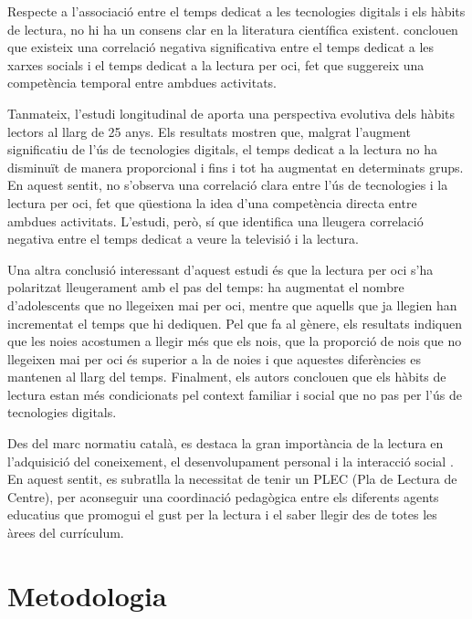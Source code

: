 \documentclass[12pt]{article}
\begin{document}
Respecte a l’associació entre el temps dedicat a les tecnologies digitals i els hàbits de lectura, no hi ha un consens clar en la literatura científica existent. \textcite{akande_library} conclouen que existeix una correlació negativa significativa entre el temps dedicat a les xarxes socials i el temps dedicat a la lectura per oci, fet que suggereix una competència temporal entre ambdues activitats.

Tanmateix, l’estudi longitudinal de \textcite{johnsson_bookreading} aporta una perspectiva evolutiva dels hàbits lectors al llarg de 25 anys. Els resultats mostren que, malgrat l’augment significatiu de l’ús de tecnologies digitals, el temps dedicat a la lectura no ha disminuït de manera proporcional i fins i tot ha augmentat en determinats grups. En aquest sentit, no s’observa una correlació clara entre l’ús de tecnologies i la lectura per oci, fet que qüestiona la idea d’una competència directa entre ambdues activitats. L’estudi, però, sí que identifica una lleugera correlació negativa entre el temps dedicat a veure la televisió i la lectura.

Una altra conclusió interessant d’aquest estudi és que la lectura per oci s’ha polaritzat lleugerament amb el pas del temps: ha augmentat el nombre d’adolescents que no llegeixen mai per oci, mentre que aquells que ja llegien han incrementat el temps que hi dediquen. Pel que fa al gènere, els resultats indiquen que les noies acostumen a llegir més que els nois, que la proporció de nois que no llegeixen mai per oci és superior a la de noies i que aquestes diferències es mantenen al llarg del temps. Finalment, els autors conclouen que els hàbits de lectura estan més condicionats pel context familiar i social que no pas per l’ús de tecnologies digitals.

Des del marc normatiu català, es destaca la gran importància de la lectura en l'adquisició del coneixement, el desenvolupament personal i la interacció social \parencite{generalitatPLEC}. En aquest sentit, es subratlla la necessitat de tenir un PLEC (Pla de Lectura de Centre), per aconseguir una coordinació pedagògica entre els diferents agents educatius que promogui el gust per la lectura i el saber llegir des de totes les àrees del currículum.

\newpage
\section{Metodologia}
\end{document}
